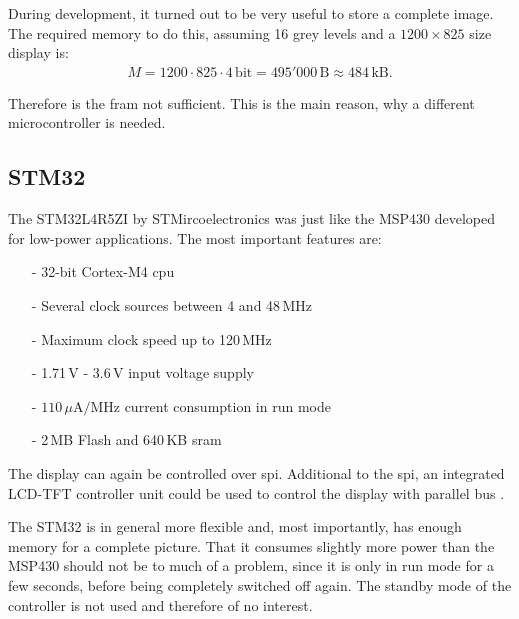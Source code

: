 During development, it turned out to be very useful to store a complete image.
The required memory to do this, assuming 16 grey levels and a $1200\times 825$ size display is:
\begin{align}
	M = 1200\cdot 825\cdot4\,\text{bit}=495'000\,\text{B} \approx 484\,\text{kB}.\label{theory:bits}
\end{align}

Therefore is the \acs{fram} not sufficient.
This is the main reason, why a different microcontroller is needed.

\subsection{STM32}
The STM32L4R5ZI by STMircoelectronics was just like the MSP430 developed for low-power applications.
The most important features are:
\begin{itemize}
	\item[-] 32-bit Cortex-M4 \acs{cpu}
	\item[-] Several clock sources between 4 and 48\,MHz
	\item[-] Maximum clock speed up to 120\,MHz
	\item[-] 1.71\,V - 3.6\,V input voltage supply
	\item[-] $110\,\mu \text{A}/\text{MHz}$ current consumption in run mode
	\item[-] 2\,MB Flash and 640\,KB \acs{sram}
\end{itemize}
The display can again be controlled over \acs{spi}.
Additional to the \acs{spi}, an integrated LCD-TFT controller unit could be used to control the display with parallel bus \cite{stm32}.

The STM32 is in general more flexible and, most importantly, has enough memory for a complete picture.
That it consumes slightly more power than the MSP430 should not be to much of a problem, since it is only in run mode for a few seconds, before being completely switched off again.
The standby mode of the controller is not used and therefore of no interest.


